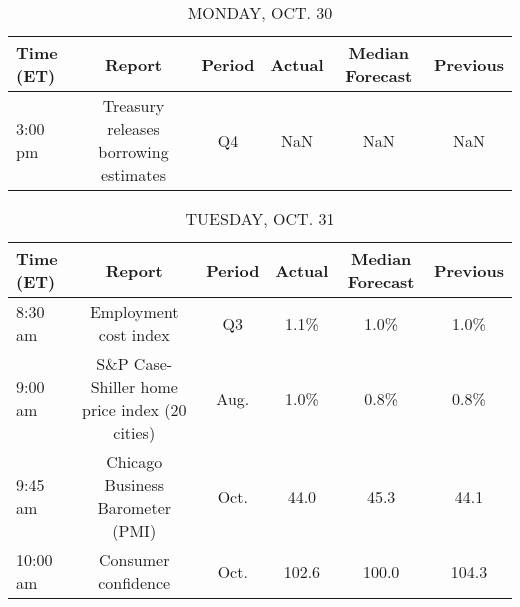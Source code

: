 \documentclass{article}%
\begin{document}
%
\normalsize%


\begin{table}[htbp]%
\caption{MONDAY, OCT. 30}%
\centering%
\begin{adjustbox}{width=1\textwidth}%
\begin{tabular}{lccccc}
\toprule
Time (ET) &                                Report & Period & Actual & Median Forecast & Previous \\
\midrule
  3:00 pm & Treasury releases borrowing estimates &     Q4 &    NaN &             NaN &      NaN \\
\bottomrule
\end{tabular}
%
\end{adjustbox}%
\end{table}

%


\begin{table}[htbp]%
\caption{TUESDAY, OCT. 31}%
\centering%
\begin{adjustbox}{width=1\textwidth}%
\begin{tabular}{lccccc}
\toprule
Time (ET) &                                        Report & Period & Actual & Median Forecast & Previous \\
\midrule
  8:30 am &                         Employment cost index &     Q3 &   1.1\% &            1.0\% &     1.0\% \\
  9:00 am & S\&P Case-Shiller home price index (20 cities) &   Aug. &   1.0\% &            0.8\% &     0.8\% \\
  9:45 am &              Chicago Business Barometer (PMI) &   Oct. &   44.0 &            45.3 &     44.1 \\
 10:00 am &                           Consumer confidence &   Oct. &  102.6 &           100.0 &    104.3 \\
\bottomrule
\end{tabular}
%
\end{adjustbox}%
\end{table}

%
\end{document}
